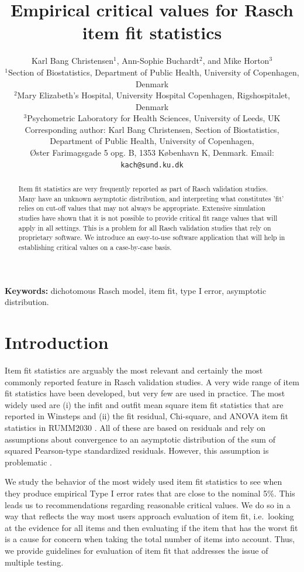 \documentclass[11pt,a4paper]{article}
\title{Empirical critical values for Rasch item fit statistics}
\author{%
    Karl Bang Christensen$^{1}$, Ann-Sophie Buchardt$^{2}$, and Mike Horton$^{3}$\\[2ex]
    \normalsize $^{1}$Section of Biostatistics, Department of Public Health, University of Copenhagen, Denmark\\
    \normalsize $^{2}$Mary Elizabeth’s Hospital, University Hospital Copenhagen, Rigshospitalet, Denmark\\
    \normalsize $^{3}$Psychometric Laboratory for Health Sciences, University of Leeds, UK\\[2ex]
    \normalsize Corresponding author: Karl Bang Christensen, Section of Biostatistics,\\
    \normalsize Department of Public Health, University of Copenhagen,\\
    \normalsize Øster Farimagsgade 5 opg. B, 1353 København K, Denmark. Email: \texttt{kach@sund.ku.dk}
}
\date{}
\begin{document}
\maketitle

\listoftodos

\begin{abstract}
Item fit statistics are very frequently reported as part of Rasch validation studies. Many have an unknown asymptotic distribution, and interpreting what constitutes 'fit' relies on cut-off values that may not always be appropriate. Extensive simulation studies have shown that it is not possible to provide critical fit range values that will apply in all settings. This is a problem for all Rasch validation studies that rely on proprietary software. We introduce an easy-to-use software application that will help in establishing critical values on a case-by-case basis.
\end{abstract}

\noindent\textbf{Keywords:} dichotomous Rasch model, item fit, type I error, asymptotic distribution.

\section{Introduction}

Item fit statistics are arguably the most relevant and certainly the most commonly reported feature in Rasch validation studies. A very wide range of item fit statistics have been developed, but very few are used in practice. The most widely used are (i) the infit and outfit mean square item fit statistics \cite{wright-Stone-1979,Wright-Masters-1982} that are reported in Winsteps \cite{Winsteps} and (ii) the fit residual, Chi-square, and ANOVA item fit statistics in RUMM2030 \cite{Andrich-Sheridan-Luo-2010}. All of these are based on residuals and rely on assumptions about convergence to an asymptotic distribution of the sum of squared Pearson-type standardized residuals. However, this assumption is problematic \cite{Jennings-1986}. 

We study the behavior of the most widely used item fit statistics to see when they produce empirical Type I error rates that are close to the nominal 5\%. This leads us to recommendations regarding reasonable critical values. We do so in a way that reflects the way most users approach evaluation of item fit, i.e.\ looking at the evidence for all items and then evaluating if the item that has the worst fit is a cause for concern when taking the total number of items into account. Thus, we provide guidelines for evaluation of item fit that addresses the issue of multiple testing. 
\end{document}
